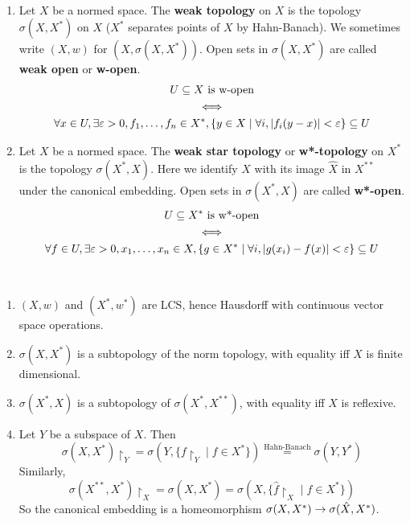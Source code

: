 \documentclass{article}
\begin{document}
\begin{egs}~
  \begin{enumerate}
    \item Let $X$  be a normed space. The {\bf weak topology} on $X$ is the topology $\sigma(X, X^*)$ on $X$ ($X^*$ separates points of $X$ by Hahn-Banach). We sometimes write $(X, w)$ for $(X, \sigma(X, X^*))$. Open sets in $\sigma(X, X^*)$ are called {\bf weak open} or {\bf w-open}.
    \begin{equation*}
      \begin{gathered}
        U \subseteq X \text{ is w-open} \\
        \iff \\
        \forall x \in U, \exists \varepsilon > 0, f_1, \dots, f_n \in X^*, \{y \in X \mid \forall i, \left\lvert f_i(y - x)\right\rvert < \varepsilon\} \subseteq U
      \end{gathered}
    \end{equation*}
    \item Let $X$ be a normed space. The {\bf weak star topology} or {\bf w*-topology} on $X^*$ is the topology $\sigma(X^*, X)$. Here we identify $X$ with its image $\hat X$ in $X^{**}$ under the canonical embedding. Open sets in $\sigma(X^*, X)$ are called {\bf w*-open}.
    \begin{equation*}
      \begin{gathered}
        U \subseteq X^* \text{ is w*-open} \\
        \iff \\
        \forall f \in U, \exists \varepsilon > 0, x_1, \dots, x_n \in X, \{g \in X^* \mid \forall i, \left\lvert g(x_i) - f(x)\right\rvert < \varepsilon\} \subseteq U
    \end{gathered}
  \end{equation*}
  \end{enumerate}
\end{egs}

\begin{properties}~
  \begin{enumerate}
    \item $(X, w)$ and $(X^*, w^*)$ are LCS, hence Hausdorff with continuous vector space operations.
    \item $\sigma(X, X^*)$ is a subtopology of the norm topology, with equality iff $X$ is finite dimensional.
    \item $\sigma(X^*, X)$ is a subtopology of $\sigma(X^*, X^{**})$, with equality iff $X$ is reflexive.
    \item Let $Y$ be a subspace of $X$. Then
    $$\sigma(X, X^*)\restriction_Y = \sigma(Y, \{f\restriction_Y \mid f \in X^*\}) \overset{\text{Hahn-Banach}} = \sigma(Y, Y^*)$$
    Similarly,
    $$\sigma(X^{**}, X^*)\restriction_X = \sigma(X, X^*) = \sigma(X, \{\hat f\restriction_X \mid f \in X^*\})$$
    So the canonical embedding is a homeomorphism $\sigma(X, X^*) \rightarrow \sigma(\hat X, X^*)$.
  \end{enumerate}
\end{properties}
\end{document}
